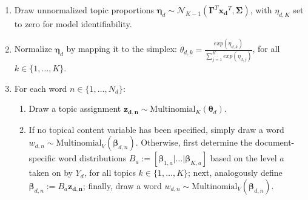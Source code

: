 \begin{enumerate}[{1)}]
\vspace{-0.25cm}
\item Draw unnormalized topic proportions $\boldsymbol{\eta}_d \sim \mathcal{N}_{K-1}(\boldsymbol{\Gamma}^T\boldsymbol{x_d}^T, \boldsymbol{\Sigma})$, with $\eta_{d,K}$ set to zero for model identifiability.
\vspace{-0.25cm}
\item Normalize $\boldsymbol{\eta}_d$ by mapping it to the simplex: $\theta_{d,k} = \frac{exp(\eta_{d,k})}{\sum_{j=1}^{K}exp(\eta_{d,j})}$, for all $k \in \{1,\dots,K\}$.
\vspace{-0.25cm}
\item For each word $n \in \{1,\dots,N_d\}$:
	\begin{enumerate}[{a)}]
	\vspace{-0.25cm}    
    \item Draw a topic assignment $\boldsymbol{z_{d,n}} \sim \text{Multinomial}_K(\boldsymbol{\theta}_d)$.
	\vspace{-0.25cm}    
    \item If no topical content variable has been specified, simply draw a word $w_{d,n} \sim \text{Multinomial}_V(\boldsymbol{\beta}_{d,n})$. Otherwise, first determine the document-specific word distributions $B_a := [\boldsymbol{\beta}_{1,a}|\dots|\boldsymbol{\beta}_{K,a}]$ based on the level $a$ taken on by $Y_d$, for all topics $k \in \{1,\dots,K\}$; next, analogously define $\boldsymbol{\beta}_{d,n}:=B_a\boldsymbol{z_{d,n}}$; finally, draw a word $w_{d,n} \sim \text{Multinomial}_V(\boldsymbol{\beta}_{d,n})$.
	\end{enumerate}
\end{enumerate}

